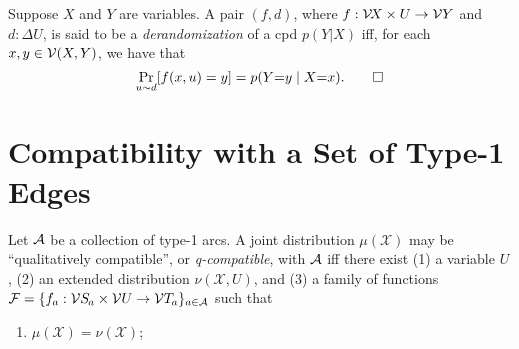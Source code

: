 \documentclass{article}
\newcommand{\X}{\mathcal X}
\begin{document}
\begin{defn}
    Suppose $X$ and $Y$ are variables.
    A pair $(f, d)$, where $f : \mathcal V\!X \times U \to \mathcal V Y$ and $d : \Delta U$,
    is said to be a \emph{derandomization} of a cpd $p(Y|X)$ iff, for each $x, y \in \mathcal V(X,Y)$, we have that 
    \[
        \Pr_{u\sim d} [ f(x, u) = y] = p(Y{=}y\mid X{=}x).
        \qedhere
    \]
\end{defn}

\section{Compatibility with a Set of Type-1 Edges}
\begin{defn}
    Let $\mathcal A 
    $ be a collection of type-1 arcs. 
    A joint distribution $\mu(\X)$ may be ``qualitatively compatible'', or
    \emph{q-compatible}, with $\mathcal A$  iff
% 
    there exist (1) a variable $U$, 
    (2) an extended distribution $\nu(\X, U)$,
    and (3) a family of 
    functions
    $\mathcal F = 
    \{ f_a : \V\Src a \times \V U \to  \V\Tgt a\}_{a\in \Ar} $ such that
    \begin{enumerate}[label=(\alph*)]
        \item $\mu(\X) = \nu(\X)$;
        

\end{enumerate}
\end{defn}
\end{document}
